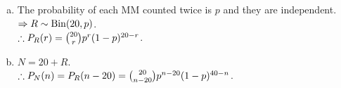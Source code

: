 \begin{pr}$ $
\begin{enumerate}[(a)]
\item	The probability of each MM counted twice is $p$ and they are independent.\\
$\Rightarrow R\sim\mathrm{Bin}(20, p)$.\\
$\therefore P_R(r)=\binom{20}rp^r(1-p)^{20-r}$.
\item $N=20+R$.\\
$\therefore P_N(n)=P_R(n-20)=\binom{20}{n-20}p^{n-20}(1-p)^{40-n}$.
\end{enumerate}
\end{pr}
